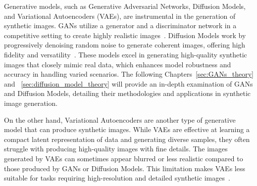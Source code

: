 \documentclass[12pt,DIV14,BCOR12mm,a4paper,footinclude=false,headinclude,parskip=half-,twoside,openright,cleardoublepage=empty,toc=index,bibliography=totoc,listof=totoc]{scrreprt}
\numberwithin{equation}{chapter}
\begin{document}
Generative models, such as Generative Adversarial Networks, Diffusion Models, and Variational Autoencoders (VAEs), are instrumental in the generation of synthetic images. GANs utilize a generator and a discriminator network in a competitive setting to create highly realistic images~\cite{schonfeld2022improving}. Diffusion Models work by progressively denoising random noise to generate coherent images, offering high fidelity and versatility~\cite{wang2023diffusion}. These models excel in generating high-quality synthetic images that closely mimic real data, which enhances model robustness and accuracy in handling varied scenarios. The following Chapters~\ref{sec:GANs_theory} and ~\ref{sec:diffusion_model_theory} will provide an in-depth examination of GANs and Diffusion Models, detailing their methodologies and applications in synthetic image generation.

On the other hand, Variational Autoencoders are another type of generative model that can produce synthetic images. While VAEs are effective at learning a compact latent representation of data and generating diverse samples, they often struggle with producing high-quality images with fine details. The images generated by VAEs can sometimes appear blurred or less realistic compared to those produced by GANs or Diffusion Models. This limitation makes VAEs less suitable for tasks requiring high-resolution and detailed synthetic images~\cite{cai2019multi}.
\end{document}
